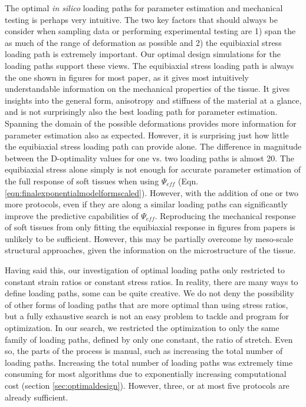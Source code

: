 	The optimal \textit{in silico} loading paths for parameter estimation and mechanical testing is perhaps very intuitive. The two key factors that should always be consider when sampling data or performing experimental testing are 1) span the as much of the range of deformation as possible and 2) the equibiaxial stress loading path is extremely important. Our optimal design simulations for the loading paths support these views. The equibiaxial stress loading path is always the one shown in figures for most paper, as it gives most intuitively understandable information on the mechanical properties of the tissue. It gives insights into the general form, anisotropy and stiffness of the material at a glance, and is not surprisingly also the best loading path for parameter estimation. Spanning the domain of the possible deformations provides more information for parameter estimation also as expected. However, it is surprising just how little the equibiaxial stress loading path can provide alone. The difference in magnitude between the D-optimality values for one vs. two loading paths is almost 20. The equibiaxial stress alone simply is not enough for accurate parameter estimation of the full response of soft tissues when using $\Psi_{eff}$ (Eqn. \ref{eqn:finalexponentialmodelformscaled}). However, with the addition of one or two more protocols, even if they are along a similar loading paths can significantly improve the predictive capabilities of $\Psi_{eff}$. Reproducing the mechanical response of soft tissues from only fitting the equibiaxial response in figures from papers is unlikely to be sufficient. However, this may be partially overcome by meso-scale structural approaches, given the information on the microstructure of the tissue.  
    
    Having said this, our investigation of optimal loading paths only restricted to constant strain ratios or constant stress ratios. In reality, there are many ways to define loading paths, some can be quite creative. We do not deny the possibility of other forms of loading paths that are more optimal than using stress ratios, but a fully exhaustive search is not an easy problem to tackle and program for optimization. In our search, we restricted the optimization to only the same family of loading paths, defined by only one constant, the ratio of stretch. Even so, the parts of the process is manual, such as increasing the total number of loading paths. Increasing the total number of loading paths was extremely time consuming for most algorithms due to exponentially increasing computational cost (section \ref{sec:optimaldesign}). However, three, or at most five protocols are already sufficient. 
    
